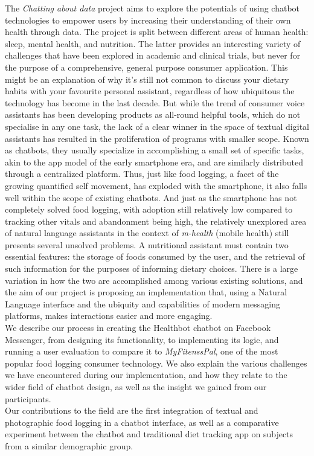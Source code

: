 The \textit{Chatting about data} project aims to explore the potentials of using chatbot technologies to empower users by increasing their understanding of their own health through data. The project is split between different areas of human health: sleep, mental health, and nutrition. The latter provides an interesting variety of challenges that have been explored in academic and clinical trials, but never for the purpose of a comprehensive, general purpose consumer application. This might be an explanation of why it’s still not common to discuss your dietary habits with your favourite personal assistant, regardless of how ubiquitous the technology has become in the last decade. But while the trend of consumer voice assistants has been developing products as all-round helpful tools, which do not specialise in any one task, the lack of a clear winner in the space of textual digital assistants has resulted in the proliferation of programs with smaller scope. Known as chatbots, they usually specialize in accomplishing a small set of specific tasks, akin to the app model of the early smartphone era, and are similarly distributed through a centralized platform. Thus, just like food logging, a facet of the growing quantified self movement, has exploded with the smartphone, it also falls well within the scope of existing chatbots.
And just as the smartphone has not completely solved food logging, with adoption still relatively low compared to tracking other vitals and abandonment being high, the relatively unexplored area of natural language assistants in the context of \textit{m-health} (mobile health) still presents several unsolved problems.
A nutritional assistant must contain two essential features: the storage of foods consumed by the user, and the retrieval of such information for the purposes of informing dietary choices. There is a large variation in how the two are accomplished among various existing solutions, and the aim of our project is proposing an implementation that, using a Natural Language interface and the ubiquity and capabilities of modern messaging platforms, makes interactions easier and more engaging. \\
We describe our process in creating the Healthbot chatbot on Facebook Messenger, from designing its functionality, to implementing its logic, and running a user evaluation to compare it to \textit{MyFitenssPal}, one of the most popular food logging consumer technology. We also explain the various challenges we have encountered during our implementation, and how they relate to the wider field of chatbot design, as well as the insight we gained from our participants. \\
Our contributions to the field are the first integration of textual and photographic food logging in a chatbot interface, as well as a comparative experiment between the chatbot and traditional diet tracking app on subjects from a similar demographic group. %
